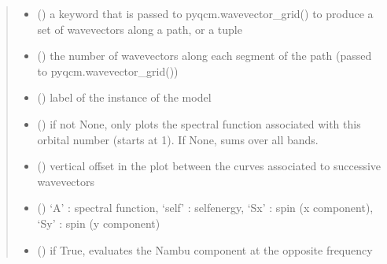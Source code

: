 \documentclass[letterpaper,10pt,english]{sphinxmanual}
\begin{document}
\begin{fulllineitems}
\begin{quote}
\begin{description}
\begin{itemize}
\item {} 
\sphinxAtStartPar
{} () \textendash{} a keyword that is passed to pyqcm.wavevector\_grid() to produce a set of wavevectors along a path, or a tuple

\item {} 
\sphinxAtStartPar
{} () \textendash{} the number of wavevectors along each segment of the path (passed to pyqcm.wavevector\_grid())

\item {} 
\sphinxAtStartPar
{} () \textendash{} label of the instance of the model

\item {} 
\sphinxAtStartPar
{} () \textendash{} if not None, only plots the spectral function associated with this orbital number (starts at 1). If None, sums over all bands.

\item {} 
\sphinxAtStartPar
{} () \textendash{} vertical offset in the plot between the curves associated to successive wavevectors

\item {} 
\sphinxAtStartPar
{} () \textendash{} ‘A’ : spectral function, ‘self’ : self\sphinxhyphen{}energy, ‘Sx’ : spin (x component), ‘Sy’ : spin (y component)

\item {} 
\sphinxAtStartPar
{} () \textendash{} if True, evaluates the Nambu component at the opposite frequency


\end{itemize}
\end{description}
\end{quote}
\end{fulllineitems}
\end{document}
